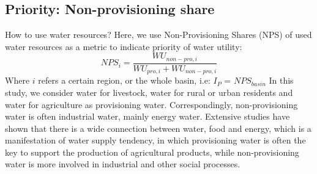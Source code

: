 \documentclass[9pt,twoside,lineno]{pnas-new}
\begin{document}
\subsection*{Priority: Non-provisioning share}
    How to use water resources?
    Here, we use Non-Provisioning Shares (NPS) of used water resources as a metric to indicate priority of water utility:
    $$ NPS_{i} = \frac{WU_{non-pro, i}}{WU_{pro, i} + WU_{non-pro, i}} $$
    Where $i$ refers a certain region, or the whole basin, i.e:
	$I_P$ = $NPS_{basin}$
    In this study, we consider water for livestock, water for rural or urban residents and water for agriculture as provisioning water. Correspondingly, non-provisioning water is often industrial water, mainly energy water. Extensive studies have shown that there is a wide connection between water, food and energy, which is a manifestation of water supply tendency, in which provisioning water is often the key to support the production of agricultural products, while non-provisioning water is more involved in industrial and other social processes. 
\end{document}
